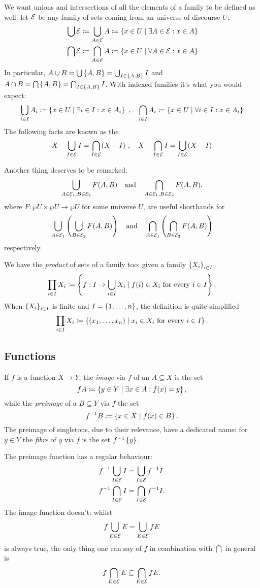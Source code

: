 We want unions and intersections of all the elements of a family to be defined as well: let \(\mathcal E\) be any family of sets coming from an universe of discourse \(U\):
\begin{align*}
& \bigcup \mathcal E \coloneq \bigcup_{A \in \mathcal E} A \coloneq \left\{x \in U \mid \exists A \in \mathcal E : x \in A\right\} \\
& \bigcap \mathcal E \coloneq \bigcap_{A \in \mathcal E} A \coloneq \left\{x \in U \mid \forall A \in \mathcal E : x \in A\right\}
\end{align*}
In particular, \(A \cup B = \bigcup \left\{A, B\right\} = \bigcup_{I \in \left\{A, B\right\}} I\) and \(A \cap B = \bigcap \left\{A, B\right\} = \bigcap_{I \in \left\{A, B\right\}} I\). With indexed families it's what you would expect:
\[\bigcup_{i \in I} A_i \coloneq \left\{x \in U \mid \exists i \in I : x \in A_i\right\} \ ,\quad \bigcap_{i \in I} A_i \coloneq \left\{x \in U \mid \forall i \in I : x \in A_i\right\}\]
The following facts are known as the 
\[X - \bigcup_{I \in \mathcal E} I = \bigcap_{I \in \mathcal E} (X - I) \ , \quad X - \bigcap_{I \in \mathcal E} I = \bigcup_{I \in \mathcal E} (X - I)\]

Another thing deserves to be remarked:
\[\bigcup_{A \in \mathcal E_1, B \in \mathcal E_2} F(A, B) \quad\text{and}\quad \bigcap_{A \in \mathcal E_1, B \in \mathcal E_2} F(A, B),\]
where \(F : \wp U \times \wp U \to \wp U\) for some universe \(U\), are useful shorthands for
\[\bigcup_{A \in \mathcal E_1} \left(\bigcup_{B \in \mathcal E_2} F(A, B)\right) \quad \text{and} \quad \bigcap_{A \in \mathcal E_1} \left(\bigcap_{B \in \mathcal E_2} F(A, B)\right)\]
respectively.

We have the {\em product} of sets of a family too: given a family \(\left\{X_i\right\}_{i \in I}\)
\[\prod_{i \in I} X_i \coloneq \left\{f : I \to \bigcup_{i \in I} X_i \mid f(i) \in X_i \text{ for every } i \in I\right\}.\]
When \(\left\{X_i\right\}_{i \in I}\) is finite and \(I = \left\{1, \dots{}, n\right\}\), the definition is quite simplified
\[\prod_{i \in I} X_i \coloneq \left\{(x_1, \dots{}, x_n) \mid x_i \in X_i \text{ for every } i \in I\right\}.\]


\subsection{Functions}

If \(f\) is a function \(X \to Y\), the {\em image} via \(f\) of an \(A \subseteq X\) is the set
\[fA \coloneq \left\{y \in Y \mid \exists x \in A : f(x)=y\right\},\]
while the {\em preimage} of a \(B \subseteq Y\) via \(f\) the set
\[f^{-1} B \coloneq \left\{x \in X \mid f(x) \in B\right\}.\]
The preimage of singletons, due to their relevance, have a dedicated name: for \(y \in Y\) the {\em fibre} of \(y\) via \(f\) is the set \(f^{-1}\left\{y\right\}\).

The preimage function has a regular behaviour:
\begin{align*}
& f^{-1} \bigcup_{I \in \mathcal E} I = \bigcup_{I \in \mathcal E} f^{-1} I \\
& f^{-1} \bigcap_{I \in \mathcal E} I = \bigcap_{I \in \mathcal E} f^{-1} I.
\end{align*}
The image function doesn't: whilst
\[f \bigcup_{E \in \mathcal E} E = \bigcup_{E \in \mathcal E} f E\]
is always true, the only thing one can say of \(f\) in combination with \(\bigcap\) in general is
\[f \bigcap_{E \in \mathcal E} E \subseteq \bigcap_{E \in \mathcal E} f E.\]

